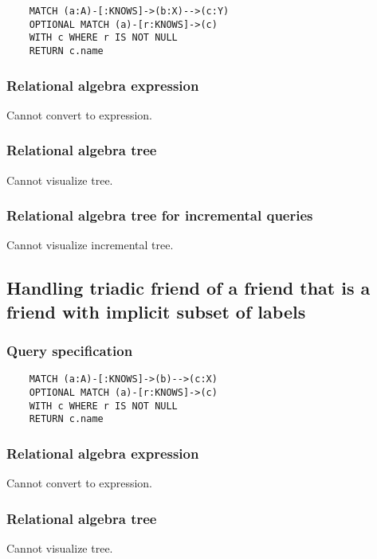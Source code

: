 	\begin{lstlisting}
	MATCH (a:A)-[:KNOWS]->(b:X)-->(c:Y)
	OPTIONAL MATCH (a)-[r:KNOWS]->(c)
	WITH c WHERE r IS NOT NULL
	RETURN c.name
	\end{lstlisting}


	\subsubsection*{Relational algebra expression}

	Cannot convert to expression.

	\subsubsection*{Relational algebra tree}

	Cannot visualize tree.

	\subsubsection*{Relational algebra tree for incremental queries}

	Cannot visualize incremental tree.
	\subsection{Handling triadic friend of a friend that is a friend with implicit subset of labels}

	\subsubsection*{Query specification}

	\begin{lstlisting}
	MATCH (a:A)-[:KNOWS]->(b)-->(c:X)
	OPTIONAL MATCH (a)-[r:KNOWS]->(c)
	WITH c WHERE r IS NOT NULL
	RETURN c.name
	\end{lstlisting}


	\subsubsection*{Relational algebra expression}

	Cannot convert to expression.

	\subsubsection*{Relational algebra tree}

	Cannot visualize tree.

